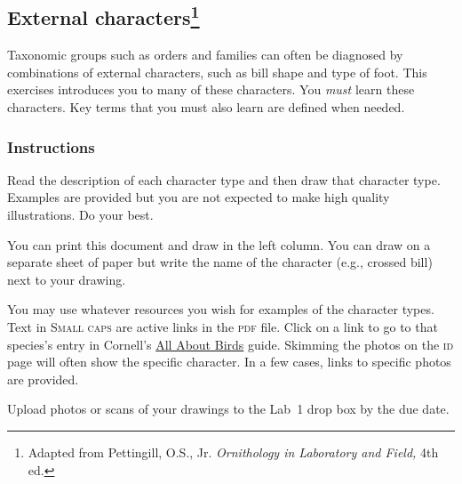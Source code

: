 \documentclass[10pt]{article}
\begin{document}
\thispagestyle{plain}

\subsection*{External characters\footnote{Adapted from Pettingill, O.S., Jr. \textit{Ornithology in Laboratory and Field,} 4th ed.}}

Taxonomic groups such as orders and families can often be diagnosed by combinations of external characters, such as bill shape and type of foot.  This exercises introduces you to many of these characters. You \emph{must} learn these characters. Key terms that you must also learn are defined when needed.

\subsubsection*{Instructions}

 Read the description of each character type and then draw that character type. Examples are provided but you are not expected to make high quality illustrations. Do your best.
 
 You can print this document and draw in the left column. You can draw on a separate sheet of paper but write the name of the character (e.g., crossed bill) next to your drawing.
 
 You may use whatever resources you wish for examples of the character types. Text in \textsc{Small caps} are active links in the \textsc{pdf} file. Click on a link to go to that species's entry in Cornell's \href{https://www.allaboutbirds.org/}{All About Birds} guide. Skimming the photos on the \textsc{id} page will often show the specific character. In a few cases, links to specific photos are provided.
 
 Upload photos or scans of your drawings to the Lab~1 drop box by the due date. 

\end{document}
